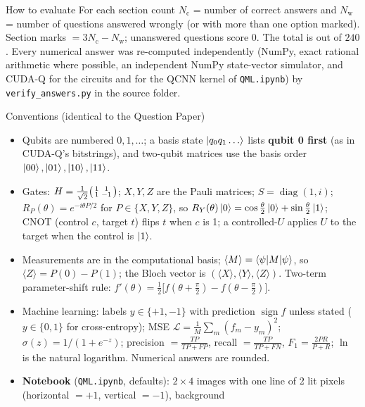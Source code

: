 \documentclass[11pt,a4paper]{article}
\begin{document}
\begin{infobox}{How to evaluate}
For each section count $N_{\mathrm c}$ = number of correct answers and $N_{\mathrm w}$ = number of questions answered wrongly (or with more than one option marked). Section marks $= 3N_{\mathrm c} - N_{\mathrm w}$; unanswered questions score $0$. The total is out of $240$.
Every numerical answer was re-computed independently (NumPy, exact rational arithmetic where possible, an independent NumPy state-vector simulator, and CUDA-Q for the circuits and for the QCNN kernel of \texttt{QML.ipynb}) by
\texttt{verify\_answers.py} in the source folder.
\end{infobox}
\begin{infobox}{Conventions (identical to the Question Paper)}
\footnotesize
\begin{itemize}[leftmargin=1.2em, itemsep=1pt, topsep=2pt]
\item Qubits are numbered $0, 1, \dots$; a basis state $\ket{q_0q_1\dots}$ lists \textbf{qubit 0 first} (as in CUDA-Q's bitstrings), and
      two-qubit matrices use the basis order $\ket{00}, \ket{01}, \ket{10}, \ket{11}$.
\item Gates: $H = \frac{1}{\sqrt2}\begin{psmallmatrix}1&1\\1&-1\end{psmallmatrix}$; $X, Y, Z$ are the Pauli matrices; $S = \operatorname{diag}(1, i)$;
      $R_P(\theta) = e^{-i\theta P/2}$ for $P \in \{X, Y, Z\}$, so $R_Y(\theta)\ket0 = \cos\frac\theta2\ket0 + \sin\frac\theta2\ket1$; CNOT (control $c$,
      target $t$) flips $t$ when $c$ is 1; a controlled-$U$ applies $U$ to the target when the control is $\ket1$.
\item Measurements are in the computational basis; $\langle M\rangle = \braket{\psi|M|\psi}$, so $\langle Z\rangle = P(0) - P(1)$; the Bloch vector is
      $(\langle X\rangle, \langle Y\rangle, \langle Z\rangle)$. Two-term parameter-shift rule: $f'(\theta) = \frac12\big[f(\theta + \frac\pi2) - f(\theta - \frac\pi2)\big]$.
\item Machine learning: labels $y \in \{+1, -1\}$ with prediction $\operatorname{sign}f$ unless stated ($y \in \{0, 1\}$ for cross-entropy);
      MSE $\mathcal L = \frac1M\sum_m(f_m - y_m)^2$; $\sigma(z) = 1/(1 + e^{-z})$; precision $= \frac{TP}{TP + FP}$, recall $= \frac{TP}{TP + FN}$,
      $F_1 = \frac{2PR}{P + R}$; $\ln$ is the natural logarithm. Numerical answers are rounded.
\item \textbf{Notebook} (\texttt{QML.ipynb}, defaults): $2\times4$ images with one line of 2 lit pixels (horizontal $= +1$, vertical $= -1$), background

\end{itemize}
\end{infobox}
\end{document}
